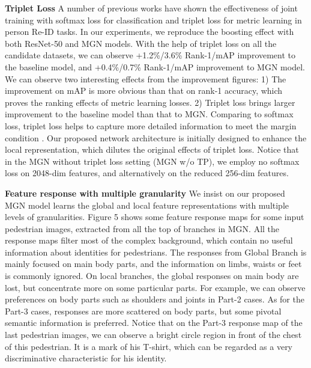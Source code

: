 \documentclass[sigconf]{acmart}
\begin{document}
\textbf{Triplet Loss} A number of previous works \cite{li2014deepreid,cheng2016perso,zhang2017alignedreid,bai2017deep} have shown the effectiveness of joint training with softmax loss for classification and triplet loss for metric learning in person Re-ID tasks. In our experiments, we reproduce the boosting effect with both ResNet-50 and MGN models. With the help of triplet loss on all the candidate datasets, we can observe +1.2\%/3.6\% Rank-1/mAP improvement to the baseline model, and +0.4\%/0.7\% Rank-1/mAP improvement to MGN model. We can observe two interesting effects from the improvement figures: 1) The improvement on mAP is more obvious than that on rank-1 accuracy, which proves the ranking effects of metric learning losses. 2) Triplet loss brings larger improvement to the baseline model than that to MGN. Comparing to softmax loss, triplet loss helps to capture more detailed information to meet the margin condition \cite{schroff2015facenet}. Our proposed network architecture is initially designed to enhance the local representation, which dilutes the original effects of triplet loss. Notice that in the MGN without triplet loss setting (MGN w/o TP), we employ no softmax loss on 2048-dim features, and alternatively on the reduced 256-dim features.

\textbf{Feature response with multiple granularity} We insist on our proposed MGN model learns the global and local feature representations with multiple levels of granularities. Figure 5 shows some feature response maps for some input pedestrian images, extracted from all the top of branches in MGN. All the response maps filter most of the complex background, which contain no useful information about identities for pedestrians. The responses from Global Branch is mainly focused on main body parts, and the information on limbs, waists or feet is commonly ignored. On local branches, the global responses on main body are lost, but concentrate more on some particular parts. For example, we can observe preferences on body parts such as shoulders and joints in Part-2 cases. As for the Part-3 cases, responses are more scattered on body parts, but some pivotal semantic information is preferred. Notice that on the Part-3 response map of the last pedestrian images, we can observe a bright circle region in front of the chest of this pedestrian. It is a mark of his T-shirt, which can be regarded as a very discriminative characteristic for his identity. 
\end{document}
